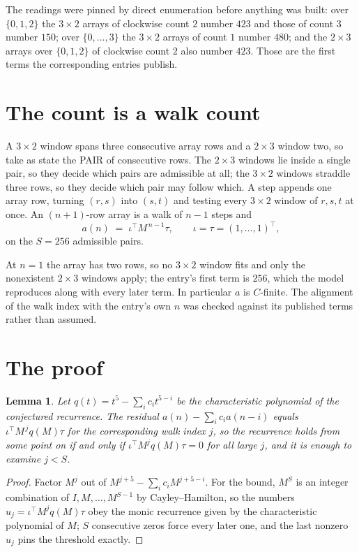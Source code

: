 \documentclass[11pt,a4paper]{article}
\theoremstyle{plain}
\newtheorem{lemma}[theorem]{Lemma}
\theoremstyle{definition}
\begin{document}
The readings were pinned by direct enumeration before anything was built: over
$\{0,1,2\}$ the $3\times2$ arrays of clockwise count $2$ number $423$ and those of count
$3$ number $150$; over $\{0,\dots,3\}$ the $3\times2$ arrays of count $1$ number $480$;
and the $2\times3$ arrays over $\{0,1,2\}$ of clockwise count $2$ also number $423$. Those
are the first terms the corresponding entries publish.

\section{The count is a walk count}

A $3\times2$ window spans three consecutive array rows and a $2\times3$
window two, so take as state the PAIR of consecutive rows. The $2\times3$ windows lie inside a
single pair, so they decide which pairs are admissible at all; the $3\times2$ windows straddle
three rows, so they decide which pair may follow which. A step appends one array row, turning
$(r,s)$ into $(s,t)$ and testing every $3\times2$ window of $r,s,t$ at once. An $(n+1)$-row
array is a walk of $n-1$ steps and
\[
a(n)\;=\;\iota^{\!\top}M^{\,n-1}\tau,\qquad\iota=\tau=(1,\dots,1)^{\!\top},
\]
on the $S=256$ admissible pairs.

At $n=1$ the array has two rows, so no $3\times2$ window fits and only the
nonexistent $2\times3$ windows apply; the entry's first term is
$256$, which the model reproduces along with every later term.
In particular $a$ is $C$-finite. The alignment of the walk index with the entry's own $n$ was
checked against its published terms rather than assumed.

\section{The proof}

\begin{lemma}\label{lem:crit}
Let $q(t)=t^{5}-\sum_i c_it^{5-i}$ be the characteristic polynomial of the
conjectured recurrence. The residual $a(n)-\sum_ic_ia(n-i)$ equals
$\iota^{\!\top}M^{\,j}q(M)\tau$ for the corresponding walk index $j$, so the recurrence
holds from some point on if and only if $\iota^{\!\top}M^{j}q(M)\tau=0$ for all large $j$,
and it is enough to examine $j<S$.
\end{lemma}

\begin{proof}
Factor $M^{j}$ out of $M^{j+5}-\sum_ic_iM^{j+5-i}$. For the bound, $M^{S}$
is an integer combination of $I,M,\dots,M^{S-1}$ by Cayley--Hamilton, so the numbers
$u_j=\iota^{\!\top}M^{j}q(M)\tau$ obey the monic recurrence given by the characteristic
polynomial of $M$; $S$ consecutive zeros force every later one, and the last nonzero $u_j$
pins the threshold exactly.
\end{proof}
\end{document}
